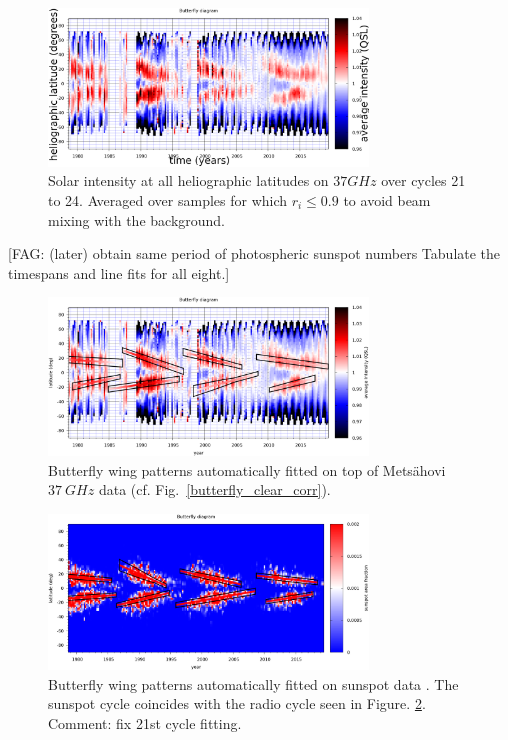 \documentclass{aa}
\newcommand{\fag}[1]{\textcolor{midpurple}{[FAG: #1]}} %
\begin{document}

\begin{figure}
\centering
\includegraphics[width=8.5cm]{butterfly_clear_raw.png}
\caption{Solar intensity at all heliographic latitudes on $\si{37}{GHz}$ over cycles 21 to 24. Averaged over samples for which $r_i \le 0.9$ to avoid beam mixing with the background.
}
\label{butterfly_clear_raw}
\end{figure}
\fag{(later) obtain same period of photospheric sunspot numbers
Tabulate the timespans and line fits for all eight.}\\

\begin{figure}
\centering
\includegraphics[width=8.5cm]{butterfly_wingfit_raw.png}
\caption{Butterfly wing patterns automatically fitted on top of Mets\"ahovi $\SI{37}{GHz}$ data (cf. Fig.~\ref{butterfly_clear_corr}).} 
\label{butterfly_wingfit_raw}
\end{figure}

\begin{figure}
\centering
\includegraphics[width=8.5cm]{butterfly_wingfit_sunspot.png}
\caption{Butterfly wing patterns automatically fitted on sunspot data \cite{SUNSPOTDATA:1}. The sunspot cycle coincides with the radio cycle seen in Figure. \ref{butterfly_wingfit_raw}. Comment: fix 21st cycle fitting.}
\label{butterfly_wingfit_sunspot}
\end{figure}
\end{document}
